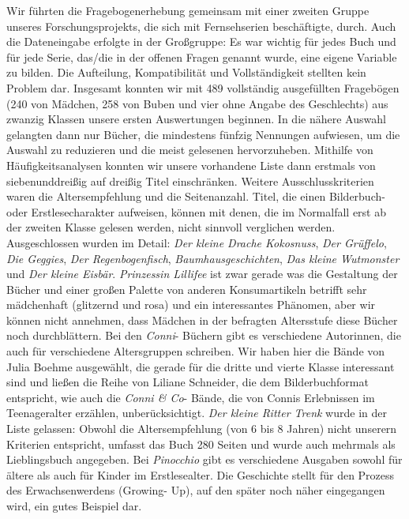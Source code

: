 Wir führten die Fragebogenerhebung gemeinsam mit einer zweiten Gruppe
unseres Forschungsprojekts, die sich mit Fernsehserien beschäftigte,
durch. Auch die Dateneingabe erfolgte in der Großgruppe: Es war wichtig
für jedes Buch und für jede Serie, das/die in der offenen Fragen genannt
wurde, eine eigene Variable zu bilden. Die Aufteilung, Kompatibilität
und Vollständigkeit stellten kein Problem dar. Insgesamt konnten wir mit
489 vollständig ausgefüllten Fragebögen (240 von Mädchen, 258 von Buben
und vier ohne Angabe des Geschlechts) aus zwanzig Klassen unsere ersten
Auswertungen beginnen. In die nähere Auswahl gelangten dann nur Bücher,
die mindestens fünfzig Nennungen aufwiesen, um die Auswahl zu reduzieren
und die meist gelesenen hervorzuheben. Mithilfe von Häufigkeitsanalysen
konnten wir unsere vorhandene Liste dann erstmals von siebenunddreißig
auf dreißig Titel einschränken. Weitere Ausschlusskriterien waren die
Altersempfehlung und die Seitenanzahl. Titel, die einen Bilderbuch- oder
Erstlesecharakter aufweisen, können mit denen, die im Normalfall erst ab
der zweiten Klasse gelesen werden, nicht sinnvoll verglichen werden.
Ausgeschlossen wurden im Detail: \emph{Der kleine Drache Kokosnuss},
\emph{Der Grüffelo}, \emph{Die Geggies}, \emph{Der Regenbogenfisch},
\emph{Baumhausgeschichten}, \emph{Das kleine Wutmonster} und \emph{Der
kleine Eisbär}. \emph{Prinzessin Lillifee} ist zwar gerade was die
Gestaltung der Bücher und einer großen Palette von anderen
Konsumartikeln betrifft sehr mädchenhaft (glitzernd und rosa) und ein
interessantes Phänomen, aber wir können nicht annehmen, dass Mädchen in
der befragten Altersstufe diese Bücher noch durchblättern. Bei den
\emph{Conni}- Büchern gibt es verschiedene Autorinnen, die auch für
verschiedene Altersgruppen schreiben. Wir haben hier die Bände von Julia
Boehme ausgewählt, die gerade für die dritte und vierte Klasse
interessant sind und ließen die Reihe von Liliane Schneider, die dem
Bilderbuchformat entspricht, wie auch die \emph{Conni \& Co}- Bände, die
von Connis Erlebnissen im Teenageralter erzählen, unberücksichtigt.
\emph{Der kleine Ritter Trenk} wurde in der Liste gelassen: Obwohl die
Altersempfehlung (von 6 bis 8 Jahren) nicht unserern Kriterien
entspricht, umfasst das Buch 280 Seiten und wurde auch mehrmals als
Lieblingsbuch angegeben. Bei \emph{Pinocchio} gibt es verschiedene
Ausgaben sowohl für ältere als auch für Kinder im Erstlesealter. Die
Geschichte stellt für den Prozess des Erwachsenwerdens (Growing- Up),
auf den später noch näher eingegangen wird, ein gutes Beispiel dar.

